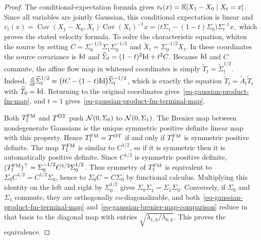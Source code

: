 \begin{proof}
The conditional-expectation formula gives
\(v_t(x)=\mathbb{E}[X_1-X_0\mid X_t=x]\).
Since all variables are jointly Gaussian, this conditional expectation is linear and
\(v_t(x) = \operatorname{Cov}(X_1-X_0,X_t)\operatorname{Cov}(X_t)^{-1}x = \bigl(t\Sigma_1-(1-t)\Sigma_0\bigr)\Sigma_t^{-1}x,\)
which proves the stated velocity formula. To solve the characteristic equation, whiten the source by setting \(C=\Sigma_0^{-1/2}\Sigma_1\Sigma_0^{-1/2}\) and \(\widetilde X_t=\Sigma_0^{-1/2}X_t\).
In these coordinates the source covariance is $\mathrm{Id}$ and
\(\widetilde\Sigma_t=(1-t)^2\mathrm{Id}+t^2C\).
Because $\mathrm{Id}$ and $C$ commute, the affine flow map in whitened coordinates is simply $\widetilde T_t=\widetilde\Sigma_t^{1/2}$. Indeed,
$\frac{\mathrm{d}}{\mathrm{d} t}\widetilde\Sigma_t^{1/2}=\bigl(tC-(1-t)\mathrm{Id}\bigr)\widetilde\Sigma_t^{-1/2}$, which is exactly the equation $\dot{\widetilde T}_t=\widetilde A_t\widetilde T_t$ with $\widetilde T_0=\mathrm{Id}$. Returning to the original coordinates gives~\eqref{eq-gaussian-product-fm-map}, and $t=1$ gives~\eqref{eq-gaussian-product-fm-terminal-map}.

Both $T_1^{\rm FM}$ and $T^{\rm OT}$ push $\mathcal{N}(0,\Sigma_0)$ to $\mathcal{N}(0,\Sigma_1)$. The Brenier map between nondegenerate Gaussians is the unique symmetric positive definite linear map with this property. Hence $T_1^{\rm FM}=T^{\rm OT}$ if and only if $T_1^{\rm FM}$ is symmetric positive definite. The map $T_1^{\rm FM}$ is similar to $C^{1/2}$, so if it is symmetric then it is automatically positive definite. Since $C^{1/2}$ is symmetric positive definite, \((T_1^{\rm FM})^\top=\Sigma_0^{-1/2}C^{1/2}\Sigma_0^{1/2}\).
Thus symmetry of $T_1^{\rm FM}$ is equivalent to
$\Sigma_0 C^{1/2}=C^{1/2}\Sigma_0$, hence to $\Sigma_0 C=C\Sigma_0$ by functional calculus. Multiplying this identity on the left and right by $\Sigma_0^{1/2}$ gives $\Sigma_0\Sigma_1=\Sigma_1\Sigma_0$. Conversely, if $\Sigma_0$ and $\Sigma_1$ commute, they are orthogonally co-diagonalizable, and both~\eqref{eq-gaussian-product-fm-terminal-map} and~\eqref{eq-gaussian-brenier-map-comparison} reduce in that basis to the diagonal map with entries $\sqrt{\lambda_{1,k}/\lambda_{0,k}}$. This proves the equivalence.
\end{proof}
